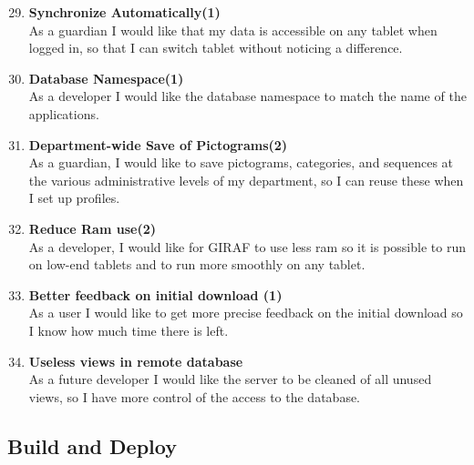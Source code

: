 \begin{enumerate}
	\setcounter{enumi}{28} %
	\item \textbf{Synchronize Automatically(1)}\\
	As a guardian I would like that my data is accessible on any tablet when logged in, so that I can switch tablet without noticing a difference.
	
	\item \textbf{Database Namespace(1)}\\
	As a developer I would like the database namespace to match the name of the applications.
	
	\item \textbf{Department-wide Save of Pictograms(2)}\\
	As a guardian, I would like to save pictograms, categories, and sequences at the various administrative levels of my department, so I can reuse these when I set up profiles.
	
	\item \textbf{Reduce Ram use(2)}\\
	As a developer, I would like for GIRAF to use less ram so it is possible to run on low-end tablets and to run more smoothly on any tablet.
	
	\item \textbf{Better feedback on initial download (1)}\\
	As a user I would like to get more precise feedback on the initial download so I know how much time there is left.
	
	\item \textbf{Useless views in remote database}\\
	As a future developer I would like the server to be cleaned of all unused views, so I have more control of the access to the database.
\end{enumerate}

\subsection{Build and Deploy}

